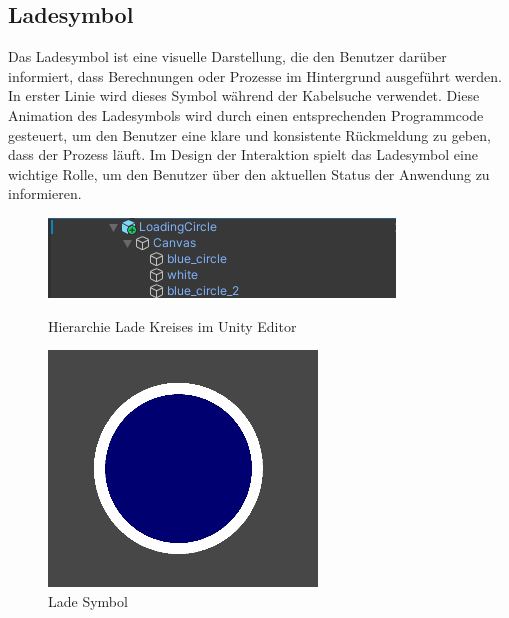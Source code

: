 \subsection{Ladesymbol}\label{sec:ladeSymbol}
Das Ladesymbol ist eine visuelle Darstellung, die den Benutzer darüber informiert, dass Berechnungen oder Prozesse im Hintergrund ausgeführt werden. In erster Linie wird dieses Symbol während der Kabelsuche verwendet. Diese Animation des Ladesymbols wird durch einen entsprechenden Programmcode gesteuert, um den Benutzer eine klare und konsistente Rückmeldung zu geben, dass der Prozess läuft. Im Design der Interaktion spielt das Ladesymbol eine wichtige Rolle, um den Benutzer über den aktuellen Status der Anwendung zu informieren.
\begin{figure}[H]
    \centering
    \begin{minipage}[b]{0.65\textwidth}
        \centering
        \includegraphics[width=\textwidth]{images/LadeKreisHierachy.png}
        \caption{Hierarchie Lade Kreises im Unity Editor}
    \end{minipage}
    \hfill
    \begin{minipage}[b]{0.3\textwidth}
        \centering
        \includegraphics[width=\textwidth]{images/LadeKreisBsp.png}
        \caption{Lade Symbol}
        \label{fig:Loading}
    \end{minipage}
\end{figure}
